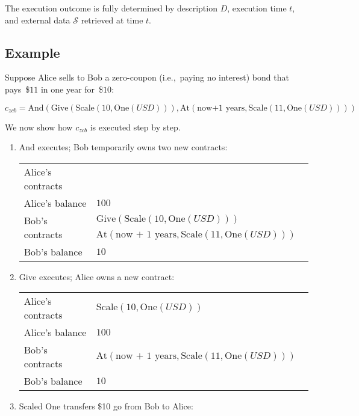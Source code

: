 The execution outcome is fully determined by description $D$, execution time $t$, and external data $\mathcal{S}$ retrieved at time $t$.


\subsection{Example}

Suppose Alice sells to Bob a zero-coupon (i.e.,~paying no interest) bond that pays~\$$11$ in one year for~\$$10$:

\[c_{zcb} = \mathrm{And}(\mathrm{Give}(\mathrm{Scale}(10,\mathrm{One}(USD))),\mathrm{At}(\text{now+1 years},\mathrm{Scale}(11,\mathrm{One}(USD))))\]

We now show how \(c_{zcb}\) is executed step by step.

\begin{enumerate}
	
	\item \(\mathrm{And}\) executes; Bob temporarily owns two new contracts:
	
	\begin{tabular}{| p{0.25\linewidth} | p{0.75\linewidth} |}
		\hline
		Alice's contracts & \\
		Alice's balance & $100$ \\
		\multirow{2}{10em}{Bob's contracts} & \(\mathrm{Give}(\mathrm{Scale}(10,\mathrm{One}(USD)))\)\\
		& \(\mathrm{At}(\text{now + 1 years},\mathrm{Scale}(11,\mathrm{One}(USD)))\)\\
		Bob's balance & $10$ \\
		\hline    
	\end{tabular}
	
	\item \(\mathrm{Give}\) executes; Alice owns a new contract:
	
	\begin{tabular}{| p{0.25\linewidth} | p{0.75\linewidth} |}
		\hline
		Alice's contracts & \(\mathrm{Scale}(10,\mathrm{One}(USD))\) \\
		Alice's balance & $100$ \\
		Bob's contracts & \(\mathrm{At}(\text{now + 1 years},\mathrm{Scale}(11,\mathrm{One}(USD)))\) \\
		Bob's balance & $10$ \\
		\hline    
	\end{tabular}
	
	\item Scaled \(\mathrm{One}\) transfers \$10 go from Bob to Alice:
	

\end{enumerate}
